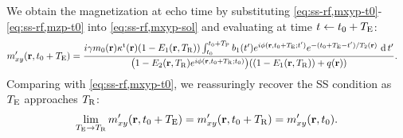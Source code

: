 We obtain the magnetization
at echo time
by substituting \eqref{eq:ss-rf,mxyp-t0}-\eqref{eq:ss-rf,mzp-t0} 
into \eqref{eq:ss-rf,mxyp-sol} 
and evaluating at time $t \gets t_0+T_\mathrm{E}$:
\begin{align}
	\mxyp(\bmr, t_0 + \TE) &= 
		\frac{%
			i \gam \mzero\pr \stx\pr (1-\EoR) 
			\int_{t_0}^{t_0+\TP} \bone(t') e^{i \phi(\bmr, t_0+\TE; t')} 
			e^{-(t_0+\TE-t')/\Tt\pr} \der t'
			}{%
				\paren{1-\EtR e^{i \phi(\bmr, t_0 + \TR; t_0)}} \paren{(1-\EoR) + q\pr}
			}.%
	\label{eq:ss-rf,mxyp-te}
\end{align}
Comparing with \eqref{eq:ss-rf,mxyp-t0}, 
we reassuringly recover the SS condition
as $T_\mathrm{E}$ approaches $T_\mathrm{R}$: 
\begin{align}
	\lim_{\TE \rightarrow \TR} \mxyp(\bmr, t_0 + \TE) 
		= \mxyp(\bmr, t_0 + \TR) 
		= \mxyp\prtz.
	\label{eq:ss-rf,mxyp-te,sanity}
\end{align}

